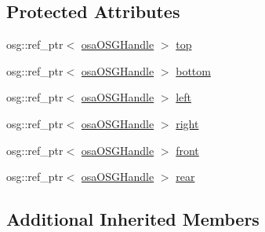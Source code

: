 \subsection*{Protected Attributes}
\begin{DoxyCompactItemize}
\item 
osg\-::ref\-\_\-ptr$<$ \hyperlink{classosa_o_s_g_handle}{osa\-O\-S\-G\-Handle} $>$ \hyperlink{classosa_o_s_g_body_u_i_a5737e52da9fa403eee45b672873e51c1}{top}
\item 
osg\-::ref\-\_\-ptr$<$ \hyperlink{classosa_o_s_g_handle}{osa\-O\-S\-G\-Handle} $>$ \hyperlink{classosa_o_s_g_body_u_i_a83f9d28bb8372a0e6772fcef3217e132}{bottom}
\item 
osg\-::ref\-\_\-ptr$<$ \hyperlink{classosa_o_s_g_handle}{osa\-O\-S\-G\-Handle} $>$ \hyperlink{classosa_o_s_g_body_u_i_a850b2ab2b5a8bd278ad22c00a6313502}{left}
\item 
osg\-::ref\-\_\-ptr$<$ \hyperlink{classosa_o_s_g_handle}{osa\-O\-S\-G\-Handle} $>$ \hyperlink{classosa_o_s_g_body_u_i_a7cda4d7ffa7040ba452edd7e31ebf6f5}{right}
\item 
osg\-::ref\-\_\-ptr$<$ \hyperlink{classosa_o_s_g_handle}{osa\-O\-S\-G\-Handle} $>$ \hyperlink{classosa_o_s_g_body_u_i_adae724839022e0f6dffdad27939da0f2}{front}
\item 
osg\-::ref\-\_\-ptr$<$ \hyperlink{classosa_o_s_g_handle}{osa\-O\-S\-G\-Handle} $>$ \hyperlink{classosa_o_s_g_body_u_i_aa32fb4a77a38fdefe326191750129319}{rear}
\end{DoxyCompactItemize}
\subsection*{Additional Inherited Members}


